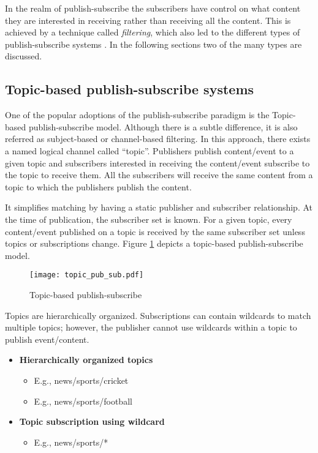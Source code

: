 In the realm of publish-subscribe the subscribers have control on what content they are interested in receiving rather than receiving all the content. This is achieved by a technique called \textit {filtering}, which also led to the different types of publish-subscribe systems \parencite{Eugster:2003:MFP:857076.857078}. In the following sections two of the many types are discussed.

\subsection{Topic-based publish-subscribe systems}

One of the popular adoptions of the publish-subscribe paradigm is the Topic-based publish-subscribe model. Although there is a subtle difference, it is also referred as subject-based or channel-based filtering. In this approach, there exists a named logical channel called \enquote{topic}. Publishers publish content/event to a given topic and subscribers interested in receiving the content/event subscribe to the topic to receive them. All the subscribers will receive the same content from a topic to which the publishers publish the content. 

It simplifies matching by having a static publisher and subscriber relationship. At the time of publication, the subscriber set is known. For a given topic, every content/event published on a topic is received by the same subscriber set unless topics or subscriptions change. Figure \ref{figures:topic_pub_sub} depicts a topic-based publish-subscribe model.

    \makeatletter
    \setlength{\intextsep}{20pt}
    \makeatother

    \begin{figure}[h!]
    \centering
    \texttt{[image: topic\_pub\_sub.pdf]}
    \caption{Topic-based publish-subscribe}\label{figures:topic_pub_sub}
    \end{figure}

Topics are hierarchically organized. Subscriptions can contain wildcards to match multiple topics; however, the publisher cannot use wildcards within a topic to publish event/content.

\begin{itemize}
\item[]\textbf{Hierarchically organized topics}
    \begin{itemize}
    \item E.g., news/sports/cricket
    \item E.g., news/sports/football
    \end{itemize}

\item[]\textbf{Topic subscription using wildcard}
    \begin{itemize}
    \item E.g., news/sports/*
    \end{itemize}
\end{itemize}



